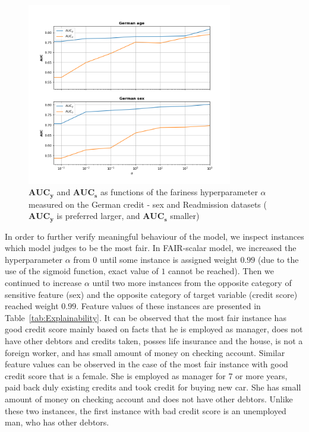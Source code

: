 \documentclass[preprint,12pt]{elsarticle}
\begin{document}
\begin{figure}[h]
	\center
	\includegraphics[angle=0, width=0.8\textwidth]{AUC_y_A.png}
	\captionsetup{justification=centering}
	\caption{$\mathbf{AUC_y}$ and $\mathbf{AUC_s}$ as functions of the fariness hyperparameter $\alpha$ measured on the  German credit - sex and Readmission datasets ($\mathbf{AUC_y}$ is preferred larger, and $\mathbf{AUC_s}$ smaller)}
	\label{fig:FigResultsAlpha}
\end{figure}


In order to further verify meaningful behaviour of the model, we inspect instances which model judges to be the most fair. In FAIR-scalar model, we increased the hyperparameter $\alpha$ from 0 until some instance is assigned weight $0.99$ (due to the use of the sigmoid function, exact value of $1$ cannot be reached).
Then we continued to increase $\alpha$ until two more instances from the opposite category of sensitive feature (sex) and the opposite category of target variable (credit score) reached weight $0.99$. Feature values of these instances are presented in Table~\ref{tab:Explainability}. It can be observed that the most fair instance has good credit score mainly based on facts that he is employed as manager, does not have other debtors and credits taken, posses life insurance and the house, is not a foreign worker, and has small amount of money on checking account. Similar feature values can be observed in the case of the most fair instance with good credit score that is a female. She is employed as manager for 7 or more years, paid back duly existing credits and took credit for buying new car. She has small amount of money on checking account and does not have other debtors. Unlike these two instances, the first instance with bad credit score is an unemployed man, who has other debtors.
\end{document}
